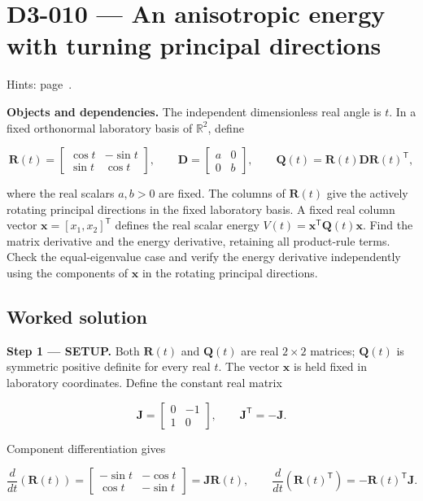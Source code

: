 \documentclass[11pt,oneside,openany]{book}
\begin{document}
\section{D3-010 --- An anisotropic energy with turning principal directions}
\label{problem:D3-010}
{\small Hints: page~\pageref{hints:D3-010}.}\par\medskip

\textbf{Objects and dependencies.} The independent dimensionless real angle is \(t\). In a fixed orthonormal laboratory basis of \(\mathbb R^2\), define

\[
\mathbf R(t)=\begin{bmatrix}\cos t&-\sin t\\\sin t&\cos t\end{bmatrix},\qquad
\mathbf D=\begin{bmatrix}a&0\\0&b\end{bmatrix},\qquad
\mathbf Q(t)=\mathbf R(t)\mathbf D\mathbf R(t)^{\mathsf T},
\]

where the real scalars \(a,b>0\) are fixed. The columns of \(\mathbf R(t)\) give the actively rotating principal directions in the fixed laboratory basis. A fixed real column vector \(\mathbf x=[x_1,x_2]^{\mathsf T}\) defines the real scalar energy \(V(t)=\mathbf x^{\mathsf T}\mathbf Q(t)\mathbf x\). Find the matrix derivative and the energy derivative, retaining all product-rule terms. Check the equal-eigenvalue case and verify the energy derivative independently using the components of \(\mathbf x\) in the rotating principal directions.
\subsection*{Worked solution}

\textbf{Step 1 --- SETUP.} Both \(\mathbf R(t)\) and \(\mathbf Q(t)\) are real \(2\times2\) matrices; \(\mathbf Q(t)\) is symmetric positive definite for every real \(t\). The vector \(\mathbf x\) is held fixed in laboratory coordinates. Define the constant real matrix

\[
\mathbf J=\begin{bmatrix}0&-1\\1&0\end{bmatrix},\qquad
\mathbf J^{\mathsf T}=-\mathbf J.
\]

Component differentiation gives

\[
\frac{d}{dt}\left(\mathbf R(t)\right)
=\begin{bmatrix}-\sin t&-\cos t\\\cos t&-\sin t\end{bmatrix}
=\mathbf J\mathbf R(t),\qquad
\frac{d}{dt}\left(\mathbf R(t)^{\mathsf T}\right)
=-\mathbf R(t)^{\mathsf T}\mathbf J.
\]
\end{document}
